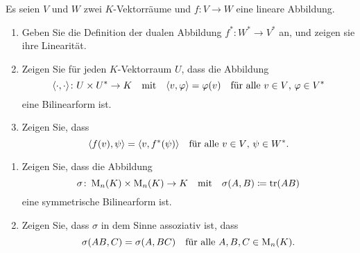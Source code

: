 \documentclass[a4paper,10pt]{article}
\begin{document}
\begin{question}
  Es seien $V$ und $W$ zwei $K$-Vektorräume und $f \colon V \to W$ eine lineare Abbildung.
  \begin{enumerate}[leftmargin=*]
    \item
      Geben Sie die Definition der dualen Abbildung $f^* \colon W^* \to V^*$ an, und zeigen sie ihre Linearität.
    \item
      Zeigen Sie für jeden $K$-Vektorraum $U$, dass die Abbildung
      \[
        \langle \cdot, \cdot \rangle \colon U \times U^* \to K
        \quad\text{mit}\quad
        \langle v, \varphi \rangle = \varphi(v)
        \quad\text{für alle $v \in V$, $\varphi \in V^*$}
      \]
      eine Bilinearform ist.
    \item
      Zeigen Sie, dass
      \[
        \langle f(v), \psi \rangle = \langle v, f^*(\psi) \rangle
        \quad
        \text{für alle $v \in V$, $\psi \in W^*$}.
      \]
  \end{enumerate}
\end{question}


\begin{question}
  \begin{enumerate}[leftmargin=*]
    \item
      Zeigen Sie, dass die Abbildung
      \[
        \sigma \colon \operatorname{M}_n(K) \times \operatorname{M}_n(K) \to K
        \quad\text{mit}\quad
        \sigma(A, B) \coloneqq \operatorname{tr}(AB)
      \]
      eine symmetrische Bilinearform ist.
    \item
      Zeigen Sie, dass $\sigma$ in dem Sinne assoziativ ist, dass
      \[
        \sigma(AB, C) = \sigma(A, BC)
        \quad
        \text{für alle $A, B, C \in \operatorname{M}_n(K)$}.
      \]
  \end{enumerate}
\end{question}
\end{document}
